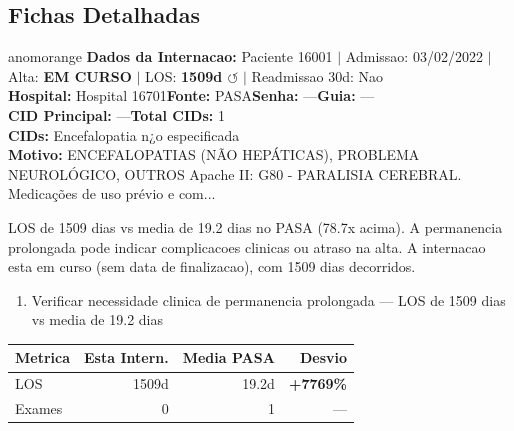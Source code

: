 \documentclass[a4paper,10pt]{article}
\begin{document}
\subsection{Fichas Detalhadas}
\begin{anomalycard}[Internacao 60842 | PASA | ALTO (z=4.71)]{anomorange}
\textbf{Dados da Internacao:} Paciente 16001 $\mid$ Admissao: 03/02/2022 $\mid$ Alta: \textcolor{anomorange}{\textbf{EM CURSO}} $\mid$ LOS: \textbf{1509d \textcolor{anomorange}{$\circlearrowleft$}} $\mid$ Readmissao 30d: Nao\\
\textbf{Hospital:} Hospital 16701\quad\textbf{Fonte:} PASA\quad\textbf{Senha:} ---\quad\textbf{Guia:} ---\\
\textbf{CID Principal:} {\small ---}\quad\textbf{Total CIDs:} 1\\

\textbf{CIDs:} {\scriptsize Encefalopatia n¿o especificada}\\

\textbf{Motivo:} {\scriptsize ENCEFALOPATIAS (NÃO HEPÁTICAS), PROBLEMA NEUROLÓGICO, OUTROS Apache II: G80 - PARALISIA CEREBRAL. Medicações de uso prévio e com...}\\

\vspace{2pt}\begin{tcolorbox}[colback=severityred!20,colframe=anomorange,title={\textbf{Interpretacao de Negocio}},fonttitle=\bfseries\small,left=4pt,right=4pt,top=3pt,bottom=3pt]
{\small LOS de 1509 dias vs media de 19.2 dias no PASA (78.7x acima). A permanencia prolongada pode indicar complicacoes clinicas ou atraso na alta. A internacao esta em curso (sem data de finalizacao), com 1509 dias decorridos.}
\end{tcolorbox}
\begin{tcolorbox}[colback=severityyellow!30,colframe=anomorange,title={\textbf{Recomendacoes Especificas}},fonttitle=\bfseries\small,left=4pt,right=4pt,top=3pt,bottom=3pt]
\begin{enumerate}[nosep,leftmargin=16pt]
\item {\small Verificar necessidade clinica de permanencia prolongada --- LOS de 1509 dias vs media de 19.2 dias}
\end{enumerate}
\end{tcolorbox}
\begin{center}\begin{tabular}{l r r r}\toprule\textbf{Metrica} & \textbf{Esta Intern.} & \textbf{Media PASA} & \textbf{Desvio} \\\midrule
LOS & 1509d & 19.2d & \textcolor{anomred}{\textbf{+7769\%}} \\
Exames & 0 & 1 & --- \\
\bottomrule\end{tabular}\end{center}


\end{anomalycard}
\end{document}
